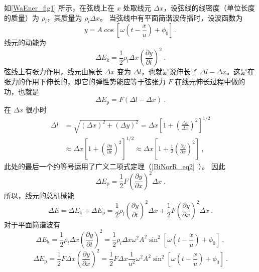 如\autoref{WaEner_fig1} 所示，在弦线上在 $x$ 处取线元 $\Delta x$，设弦线的线密度（单位长度的质量）为 $\rho_l$，其质量为 $\rho_l\Delta x$。
当弦线中有平面简谐波传播时，设波函数为
\begin{equation}
y=A \cos \left[\omega\left(t-\frac{x}{u}\right)+\phi_{0}\right]~.
\end{equation}
线元的动能为
\begin{equation}
\Delta E_{\mathrm{k}}=\frac{1}{2} \rho_{l} \Delta x\left(\frac{\partial y}{\partial t}\right)^{2}~.
\end{equation}
弦线上有张力作用，线元由原长 $\Delta x$ 变为 $\Delta l$，也就是说伸长了 $\Delta l-\Delta x$。这是在张力的作用下伸长的，即它的弹性势能应等于弦张力 $F$ 在线元伸长过程中做的功，也就是
\begin{equation}
\Delta E_{\mathrm{p}}=F(\Delta l-\Delta x)~.
\end{equation}
在 $\Delta x$ 很小时
\begin{equation}
\begin{aligned} \Delta l &=\sqrt{(\Delta x)^{2}+(\Delta y)^{2}}=\Delta x\left[1+\left(\frac{\Delta y}{\Delta x}\right)^{2}\right]^{1 / 2} \\ & \approx \Delta x\left[1+\left(\frac{\partial y}{\partial x}\right)^{2}\right]^{1 / 2} \approx \Delta x\left[1+\frac{1}{2}\left(\frac{\partial y}{\partial x}\right)^{2}\right] ~,\end{aligned}
\end{equation}
此处的最后一个约等号运用了广义二项式定理（\autoref{BiNorR_eq2}~）。
因此
\begin{equation}
\Delta E_{\mathrm{p}}=\frac{1}{2} F\left(\frac{\partial y}{\partial x}\right)^{2} \Delta x~.
\end{equation}
所以，线元的总机械能
\begin{equation}
\Delta E=\Delta E_{\mathrm{k}}+\Delta E_{\mathrm{p}}=\frac{1}{2} \rho_{l}\left(\frac{\partial y}{\partial t}\right)^{2} \Delta x+\frac{1}{2} F\left(\frac{\partial y}{\partial x}\right)^{2} \Delta x~.
\end{equation}
对于平面简谐波有
\begin{equation}
\Delta E_{\mathrm{k}}=\frac{1}{2} \rho_{l} \Delta x\left(\frac{\partial y}{\partial t}\right)^{2}=\frac{1}{2} \rho_{l} \Delta x \omega^{2} A^{2} \sin ^{2}\left[\omega\left(t-\frac{x}{u}\right)+\phi_{0}\right]~,
\end{equation}
\begin{equation}
\Delta E_{\mathrm{p}}=\frac{1}{2} F \Delta x\left(\frac{\partial y}{\partial x}\right)^{2}=\frac{1}{2} F \Delta x \frac{1}{u^{2}} \omega^{2} A^{2} \sin ^{2}\left[\omega\left(t-\frac{x}{u}\right)+\phi_{0}\right]~.
\end{equation}
